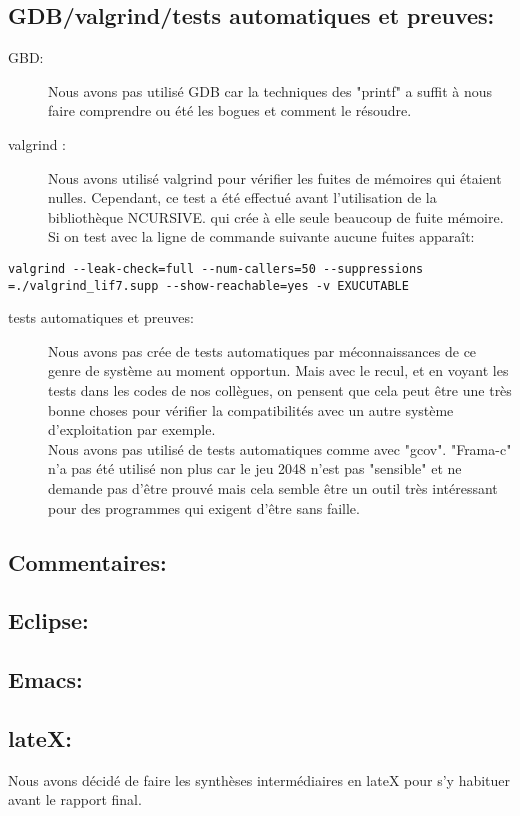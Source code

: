 \documentclass{report}
\begin{document}
\subsection*{GDB/valgrind/tests automatiques et preuves:}
\begin{description}
\item[GBD:]
Nous avons pas utilisé GDB car la techniques des "printf" a suffit à nous faire comprendre ou été les bogues et comment le résoudre.
\item[valgrind :]
Nous avons utilisé valgrind pour vérifier les fuites de mémoires qui étaient nulles. Cependant, ce test a été effectué avant l'utilisation de la bibliothèque NCURSIVE. qui crée à elle seule beaucoup de fuite mémoire. Si on test avec la ligne de commande suivante aucune fuites apparaît:
\end{description}
\begin{lstlisting}[frame=single]
valgrind --leak-check=full --num-callers=50 --suppressions
=./valgrind_lif7.supp --show-reachable=yes -v EXUCUTABLE
\end{lstlisting}
\begin{description}
\item[tests automatiques et preuves:]
Nous avons pas crée de tests automatiques par méconnaissances de ce genre de système au moment opportun. Mais avec le recul, et en voyant les tests dans les codes de nos collègues, on pensent que cela peut être une très bonne choses pour vérifier la compatibilités avec un autre système d'exploitation par exemple.\\
Nous avons pas utilisé de tests automatiques comme avec "gcov". "Frama-c" n'a pas été utilisé non plus car le jeu 2048 n'est pas "sensible" et ne demande pas d'être prouvé mais cela semble être un outil très intéressant pour des programmes qui exigent d'être sans faille.
\end{description}
\subsection*{Commentaires:}
\subsection*{Eclipse:}
\subsection*{Emacs:}
\subsection*{lateX:}
\begin{description}
Nous avons décidé de faire les synthèses intermédiaires en lateX pour s'y habituer avant le rapport final.
\end{description}
\end{document}
